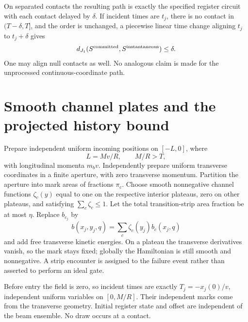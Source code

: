 \documentclass[11pt,oneside,openany]{book}
\theoremstyle{definition}
\theoremstyle{remark}\newtheorem{remark}[theorem]{Remark}
\begin{document}
On separated contacts the resulting path is exactly the specified register
circuit with each contact delayed by $\delta$. If incident times are $t_j$,
there is no contact in $(T-\delta,T]$, and the order is unchanged, a
piecewise linear time change aligning $t_j$ to $t_j+\delta$ gives
\begin{equation}\label{p:mech-J1}
 d_{J_1}(S^{\rm committed},S^{\rm instantaneous})\le\delta.
\end{equation}
One may align null contacts as well. No analogous claim is made for the
unprocessed continuous-coordinate path.

\section{Smooth channel plates and the projected history bound}

Prepare independent uniform incoming positions on $[-L,0]$, where
\[
 L=Mv/R,\qquad M/R>T,
\]
with longitudinal momenta $m_bv$. Independently prepare uniform transverse
coordinates in a finite aperture, with zero transverse momentum.
Partition the aperture into mark areas of fractions $\pi_c$.
Choose smooth nonnegative channel functions $\zeta_c(y)$ equal to one on
the respective interior plateaus, zero on other plateaus, and satisfying
$\sum_c\zeta_c\le1$. Let the total transition-strip area fraction be at most
$\eta$. Replace $b_{c_j}$ by
\[
 b(x_j,y_j,q)=\sum_c\zeta_c(y_j)b_c(x_j,q)
\]
and add free transverse kinetic energies. On a plateau the transverse
derivatives vanish, so the mark stays fixed; globally the Hamiltonian is
still smooth and nonnegative. A strip encounter is assigned to the failure
event rather than asserted to perform an ideal gate.

Before entry the field is zero, so incident times are exactly
$T_j=-x_j(0)/v$, independent uniform variables on $[0,M/R]$.
Their independent marks come from the transverse geometry. Initial register
state and offset are independent of the beam ensemble. No draw occurs at
a contact.
\end{document}
